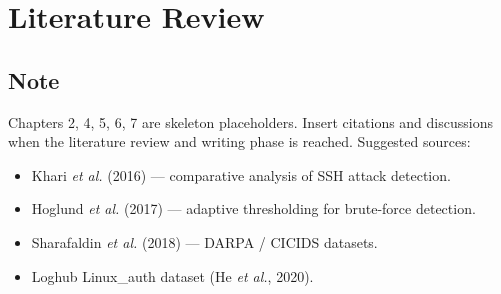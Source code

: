 \chapter{Literature Review}
\section*{Note}
Chapters 2, 4, 5, 6, 7 are skeleton placeholders. Insert citations and
discussions when the literature review and writing phase is reached. Suggested
sources:

\begin{itemize}
  \item Khari \emph{et al.} (2016) — comparative analysis of SSH attack detection.
  \item Hoglund \emph{et al.} (2017) — adaptive thresholding for brute-force detection.
  \item Sharafaldin \emph{et al.} (2018) — DARPA / CICIDS datasets.
  \item Loghub Linux\_auth dataset (He \emph{et al.}, 2020).
\end{itemize}
